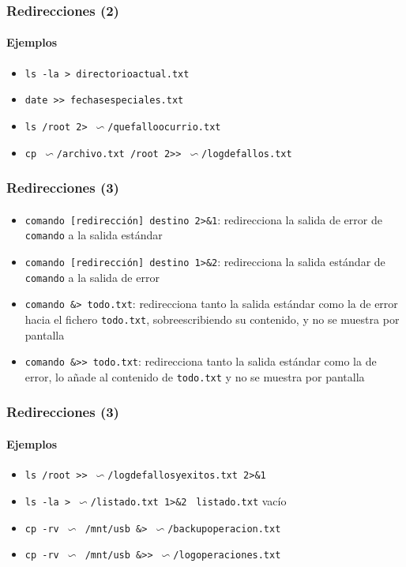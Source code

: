 \documentclass[12pt]{beamer}
\begin{document}
\begin{frame}
  \frametitle{Redirecciones (2)}
  \framesubtitle{Ejemplos}
  \begin{itemize}
    \item \texttt{ls -la > directorioactual.txt}
    \medskip
    \item \texttt{date >> fechasespeciales.txt}
    \medskip
    \item \texttt{ls /root 2> $\backsim$/quefalloocurrio.txt}
    \medskip
    \item \texttt{cp $\backsim$/archivo.txt /root 2>> $\backsim$/logdefallos.txt}
  \end{itemize}
\end{frame}

\begin{frame}
  \frametitle{Redirecciones (3)}
  \framesubtitle{}
  \begin{itemize}
    \item \texttt{comando [redirección] destino 2>\&1}: redirecciona la salida de error de \texttt{comando} a la salida estándar
    \medskip
    \item \texttt{comando [redirección] destino 1>\&2}: redirecciona la salida estándar de \texttt{comando} a la salida de error
    \medskip
    \item \texttt{comando \&> todo.txt}: redirecciona tanto la salida estándar como la de error hacia el fichero \texttt{todo.txt}, sobreescribiendo su contenido, y no se muestra por pantalla
    \medskip
    \item \texttt{comando \&>> todo.txt}: redirecciona tanto la salida estándar como la de error, lo añade al contenido de \texttt{todo.txt} y no se muestra por pantalla
  \end{itemize}
\end{frame}

\begin{frame}
  \frametitle{Redirecciones (3)}
  \framesubtitle{Ejemplos}
  \begin{itemize}
    \item \texttt{ls /root >> $\backsim$/logdefallosyexitos.txt 2>\&1}
    \medskip
    \item \texttt{ls -la > $\backsim$/listado.txt 1>\&2 } \alert{\texttt{listado.txt} vacío}
    \medskip
    \item \texttt{cp -rv $\backsim$ /mnt/usb \&> $\backsim$/backupoperacion.txt}
    \medskip
    \item \texttt{cp -rv $\backsim$ /mnt/usb \&>> $\backsim$/logoperaciones.txt}
  \end{itemize}
\end{frame}
\end{document}
